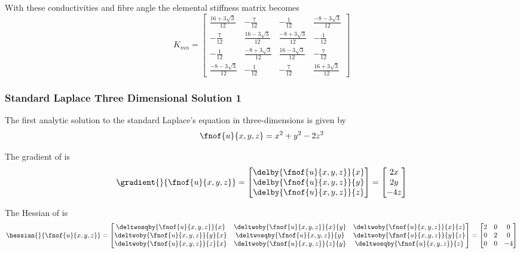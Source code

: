 With these conductivities and fibre angle the elemental stiffness matrix becomes
\begin{equation}
  K_{mn}=\begin{bmatrix}
  \frac{16+3\sqrt{3}}{12} & -\frac{7}{12} & -\frac{1}{12} & \frac{-8-3\sqrt{3}}{12} \\
  -\frac{7}{12} & \frac{16-3\sqrt{3}}{12} & \frac{-8+3\sqrt{3}}{12} & -\frac{1}{12} \\
  -\frac{1}{12} & \frac{-8+3\sqrt{3}}{12} & \frac{16-3\sqrt{3}}{12} & -\frac{7}{12} \\
  \frac{-8-3\sqrt{3}}{12} & -\frac{1}{12} & -\frac{7}{12} & \frac{16+3\sqrt{3}}{12}
  \end{bmatrix} 
\end{equation}


\subsubsection{Standard Laplace Three Dimensional Solution 1}

The first analytic solution to the standard Laplace's equation in three-dimensions is given by
\begin{equation}
  \fnof{u}{x,y,z}=x^{2}+y^{2}-2z^{2}
  \label{eqn:StandardLaplaceThreeDAnalytic1}
\end{equation}

The gradient of  is
\begin{equation}
  \gradient{}{\fnof{u}{x,y,z}}=\begin{bmatrix}
  \delby{\fnof{u}{x,y,z}}{x} \\
  \delby{\fnof{u}{x,y,z}}{y} \\
  \delby{\fnof{u}{x,y,z}}{z}
  \end{bmatrix}=\begin{bmatrix}
  2x \\
  2y \\
  -4z
  \end{bmatrix}
  \label{eqn:StandardLaplaceThreeDAnalyticGradient1}
\end{equation}

The Hessian of  is
\begin{equation}
  \hessian{}{\fnof{u}{x,y,z}}=\begin{bmatrix}
  \deltwosqby{\fnof{u}{x,y,z}}{x} & \deltwoby{\fnof{u}{x,y,z}}{x}{y} & \deltwoby{\fnof{u}{x,y,z}}{x}{z} \\
  \deltwoby{\fnof{u}{x,y,z}}{y}{x} & \deltwosqby{\fnof{u}{x,y,z}}{y} & \deltwoby{\fnof{u}{x,y,z}}{y}{z} \\
  \deltwoby{\fnof{u}{x,y,z}}{z}{x} & \deltwoby{\fnof{u}{x,y,z}}{z}{y} & \deltwosqby{\fnof{u}{x,y,z}}{z}
  \end{bmatrix}=\begin{bmatrix}
  2 & 0 & 0 \\
  0 & 2 & 0 \\
  0 & 0 & -4 \\
  \end{bmatrix}
  \label{eqn:StandardLaplaceThreeDAnalyticHessian1}
\end{equation}

